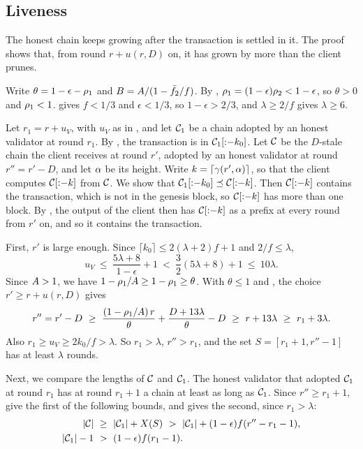 \subsection{Liveness}

The honest chain keeps growing after the transaction is settled in it. The
proof shows that, from round $r+u(r,D)$ on, it has grown by more than the
client prunes.

\begin{proofof}{}
    Write $\theta=1-\epsilon-\rho_1$ and $B=A/(1-\bar{f}_2/f)$. By
    , $\rho_1=(1-\epsilon)\rho_2<1-\epsilon$, so $\theta>0$ and
    $\rho_1<1$.  gives $f<1/3$ and $\epsilon<1/3$, so
    $1-\epsilon>2/3$, and $\lambda\ge2/f$ gives $\lambda\ge6$.

    Let $r_1=r+u_V$, with $u_V$ as in , and let $\mathcal{C}_1$
    be a chain adopted by an honest validator at round $r_1$. By
    , the transaction is in $\mathcal{C}_1[{:}{-}k_0]$. Let
    $\mathcal{C}$ be the $D$-stale chain the client receives at round $r'$, adopted
    by an honest validator at round $r''=r'-D$, and let $\alpha$ be its height.
    Write $k=\lceil\gamma(r',\alpha)\rceil$, so that the client computes
    $\mathcal{C}[{:}{-}k]$ from $\mathcal{C}$. We show that
    $\mathcal{C}_1[{:}{-}k_0]\preceq\mathcal{C}[{:}{-}k]$. Then $\mathcal{C}[{:}{-}k]$ contains
    the transaction, which is not in the genesis block, so $\mathcal{C}[{:}{-}k]$ has
    more than one block. By , the output of the client
    then has $\mathcal{C}[{:}{-}k]$ as a prefix at every round from $r'$ on, and so it
    contains the transaction.

    First, $r'$ is large enough. Since $\lceil k_0\rceil\le2(\lambda+2)f+1$ and
    $2/f\le\lambda$,
    \[
        u_V\ \le\ \frac{5\lambda+8}{1-\epsilon}+1\ <\ \frac{3}{2}(5\lambda+8)+1\ \le\ 10\lambda .
    \]
    Since $A>1$, we have $1-\rho_1/A\ge1-\rho_1\ge\theta$. With
    $\theta\le1$ and , the choice $r'\ge r+u(r,D)$ gives
    \[
        r''=r'-D\ \ge\ \frac{(1-\advrone/\maxr)\,r}{\theta}+\frac{D+13\lambda}{\theta}-D
        \ \ge\ r+13\lambda\ \ge\ r_1+3\lambda .
    \]
    Also $r_1\ge u_V\ge2k_0/f>\lambda$. So $r_1>\lambda$, $r''>r_1$, and the set
    $S=[r_1+1,r''-1]$ has at least $\lambda$ rounds.

    Next, we compare the lengths of $\mathcal{C}$ and $\mathcal{C}_1$. The honest validator
    that adopted $\mathcal{C}_1$ at round $r_1$ has at round $r_1+1$ a chain at least as
    long as $\mathcal{C}_1$. Since $r''\ge r_1+1$,  give
    the first of the following bounds, and  gives the second,
    since $r_1>\lambda$:
    \begin{align*}
        \len{\ch}\ &\ge\ \len{\ch_1}+X(S)\ >\ \len{\ch_1}+(1-\epsilon)f(r''-r_1-1),\\
        \len{\ch_1}-1\ &>\ (1-\epsilon)f(r_1-1) .
    \end{align*}


\end{proofof}

